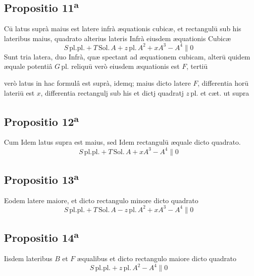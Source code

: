 \documentclass[11pt,a4paper]{article}
\begin{document}
\subsection*{Propositio 11\textsuperscript{a}}

Cū latus suprà maius est latere infrà æquationis cubicæ, et rectangulū sub his lateribus maius, quadrato alterius lateris Infrà eiusdem æquationis Cubicæ
\[ S\,\mathrm{pl.pl.} + T\,\mathrm{Sol.}\,A + z\,\mathrm{pl.}\,A^{2} + xA^{3} - A^{4} \parallel 0 \]
Sunt tria latera, duo Infrà, quæ spectant ad æquationem cubicam, alterū quidem æquale potentiâ $G\,\mathrm{pl.}$ reliquū verò eiusdem æquationis est $F$, tertiū


verò latus in hac formulâ est suprà, idemq; maius dicto latere $F$, differentia horū lateriū est $x$, differentia rectangulj sub his et dictj quadratj $z\,\mathrm{pl.}$ et cæt. ut supra

\subsection*{Propositio 12\textsuperscript{a}}

Cum Idem latus supra est maius, sed Idem rectangulū æquale dicto quadrato.
\[ S\,\mathrm{pl.pl.} + T\,\mathrm{Sol.}\,A + xA^{3} - A^{4} \parallel 0 \]

\subsection*{Propositio 13\textsuperscript{a}}

Eodem latere maiore, et dicto rectangulo minore dicto quadrato
\[ S\,\mathrm{pl.pl.} + T\,\mathrm{Sol.}\,A - z\,\mathrm{pl.}\,A^{2} + xA^{3} - A^{4} \parallel 0 \]

\subsection*{Propositio 14\textsuperscript{a}}

Iisdem lateribus $B$ et $F$ æqualibus et dicto rectangulo maiore dicto quadrato
\[ S\,\mathrm{pl.pl.} + z\,\mathrm{pl.}\,A^{2} - A^{4} \parallel 0 \]
\end{document}
